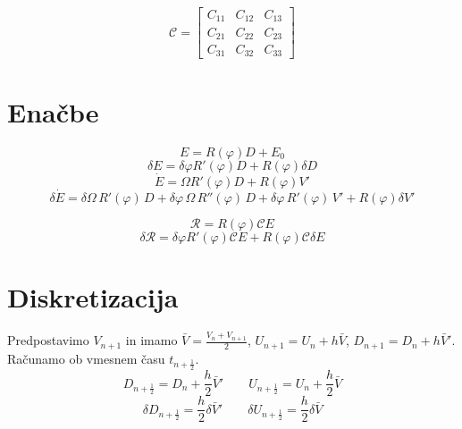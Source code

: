 \documentclass[a4paper,6pt]{article}
\begin{document}
\begin{flushleft}
$$
\mathcal{C} = \begin{bmatrix}
  C_{11} & C_{12} & C_{13}\\
  C_{21} & C_{22} & C_{23}\\
  C_{31} & C_{32} & C_{33}
\end{bmatrix}
$$

\section{Enačbe}
$$E = R(\varphi) D + E_0$$
$$\delta E = \delta\varphi R'(\varphi) D + R(\varphi) \delta D$$
$$\dot{E} = \Omega R'(\varphi) D + R(\varphi) V'$$
$$\delta\dot{E} = \delta\Omega\,R'(\varphi)\,D + \delta\varphi\,\Omega\,R''(\varphi)\,D + \delta\varphi\,R'(\varphi)\,V' + R(\varphi) \delta V'$$

\vspace{11pt}

$$\mathcal{R} = R(\varphi)\mathcal{C} E$$
$$\delta\mathcal{R} = \delta \varphi R'(\varphi) \mathcal{C} E + R(\varphi) \mathcal{C} \delta E$$


\section{Diskretizacija}
Predpostavimo $V_{n+1}$ in imamo $\bar{V} = \frac{V_n+V_{n+1}}{2}$, $U_{n+1}  =U_n +h\bar{V}$, $D_{n+1}  =D_n +h\bar{V}'$. Računamo ob vmesnem času $t_{n+\frac{1}{2}}$.
$$D_{n+\frac{1}{2}} = D_n +\frac{h}{2}\bar{V}'  \qquad  U_{n+\frac{1}{2}} = U_n+\frac{h}{2}\bar{V}$$
$$\delta D_{n+\frac{1}{2}} = \frac{h}{2}\delta\bar{V}'  \qquad  \delta U_{n+\frac{1}{2}} = \frac{h}{2}\delta \bar{V}$$














































\end{flushleft}
\end{document}
